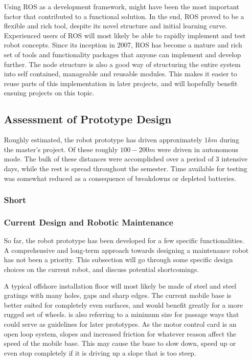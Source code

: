 Using \ac{ROS} as a development framework, might have been the most important factor that contributed to a functional solution. In the end, \ac{ROS} proved to be a flexible and rich tool, despite its novel structure and initial learning curve. Experienced users of \ac{ROS} will most likely be able to rapidly implement and test robot concepts.  Since its inception in 2007, \ac{ROS} has become a mature and rich set of tools and functionality packages that anyone can implement and develop further. The node structure is also a good way of structuring the entire system into self contained, manageable and reusable modules. This makes it easier to reuse parts of this implementation in later projects, and will hopefully benefit ensuing projects on this topic.

\subsection{Assessment of Prototype Design}

Roughly estimated, the robot prototype has driven approximately $1km$ during the master's project. Of these roughly $100-200m$ were driven in autonomous mode. The bulk of these distances were accomplished over a period of 3 intensive days, while the rest is spread throughout the semester. Time available for testing was somewhat reduced as a consequence of breakdowns or depleted batteries. 

\subsubsection{Short}

\subsubsection{Current Design and Robotic Maintenance}

So far, the robot prototype has been developed for a few specific functionalities. A comprehensive and long-term approach towards designing a maintenance robot has not been a priority. This subsection will go through some specific design choices on the current robot, and discuss potential shortcomings. 

A typical offshore installation floor will most likely be made of steel and steel gratings with many holes, gaps and sharp edges\cite{graf2008mobile}. The current mobile base is better suited for completely even surfaces, and would benefit greatly for a more rugged set of wheels. \cite{graf2008mobile} is also referring to a minimum size for passage ways that could serve as guidelines for later prototypes. As the motor control card is an open loop system, slopes and increased friction for whatever reason affect the speed of the mobile base. This may cause the base to slow down, speed up or even stop completely if it is driving up a slope that is too steep.

